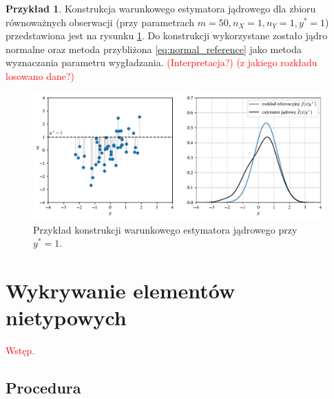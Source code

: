 \documentclass[12pt,a4paper,oneside]{book}
\theoremstyle{definition}
\newtheorem{exmp}{Przykład}[chapter]
\begin{document}
\begin{exmp}
Konstrukcja warunkowego estymatora jądrowego dla zbioru równoważnych obserwacji (przy parametrach $m=50, n_X=1, n_Y=1, y^*=1$) przedstawiona jest na rysunku \ref{fig:ckde_construction}. Do konstrukcji wykorzystane zostało jądro normalne oraz metoda przybliżona \eqref{eq:normal_reference} jako metoda wyznaczania parametru wygładzania. \textcolor{red}{(Interpretacja?) (z jakiego rozkładu losowano dane?)}

\begin{figure}[H]
    \centering
    \includegraphics[scale=0.6]{ckde_construction}
    \caption{Przykład konstrukcji warunkowego estymatora jądrowego przy $y^*=1$.}
    \label{fig:ckde_construction}
\end{figure}
\end{exmp}

\chapter{Wykrywanie elementów nietypowych}

\textcolor{red}{Wstęp.}

\section{Procedura}
\end{document}
